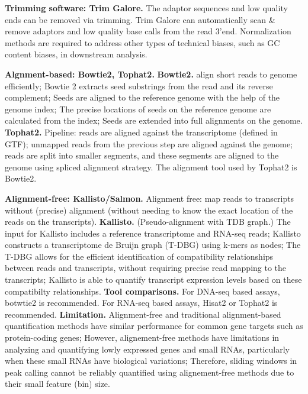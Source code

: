 \vspace{0.1em}\noindent
\textbf{Trimming software: Trim Galore.} The adaptor sequences and low quality ends can be removed via trimming. Trim Galore can automatically scan \& remove adaptors and low quality base calls from the read 3'end. Normalization methods are required to address other types of technical biases, such as GC content biases, in downstream analysis.

\vspace{0.1em}\noindent
\textbf{Algnment-based: Bowtie2, Tophat2.} \textbf{Bowtie2.} align short reads to genome efficiently; Bowtie 2 extracts seed substrings from the read and its reverse complement; Seeds are aligned to the reference genome with the help of the genome index; The precise locations of seeds on the reference genome are calculated from the index; Seeds are extended into full alignments on the genome. \textbf{Tophat2.} Pipeline: reads are aligned against the transcriptome (defined in GTF); unmapped reads from the previous step are aligned against the genome; reads are split into smaller segments, and these segments are aligned to the genome using spliced alignment strategy. The alignment tool used by Tophat2 is Bowtie2.

\vspace{0.1em}\noindent
\textbf{Alignment-free: Kallisto/Salmon.} Alignment free: map reads to transcripts without (precise) alignment (without needing to know the exact location of the reads on the transcripts). \textbf{Kallisto.} (Pseudo-alignment with TDB graph.) The input for Kallisto includes a reference transcriptome and RNA-seq reads; Kallisto constructs a transcriptome de Bruijn graph (T-DBG) using k-mers as nodes; The T-DBG allows for the efficient identification of compatibility relationships between reads and transcripts, without requiring precise read mapping to the transcripts; Kallisto is able to quantify transcript expression levels based on these compatibilty relationships. \textbf{Tool comparisons.} For DNA-seq based assays, botwtie2 is recommended. For RNA-seq based assays, Hisat2 or Tophat2 is recommended. \textbf{Limitation.} Alignment-free and traditional alignment-based quantification methods have similar performance for common gene targets such as protein-coding genes; However, alignement-free methods have limitations in analyzing and quantifying lowly expressed genes and small RNAs, particularly when these small RNAs have biological variations; Therefore, sliding windows in peak calling cannot be reliably quantified using alignement-free methods due to their small feature (bin) size.

